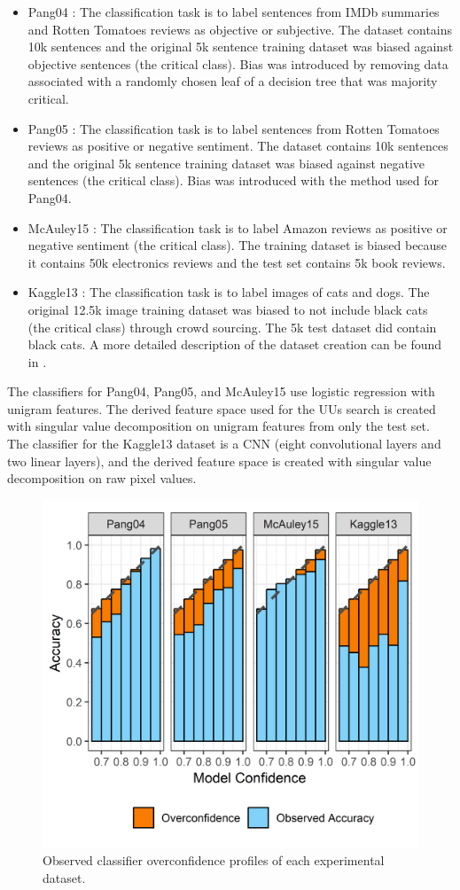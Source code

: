 \documentclass[conference]{IEEEtran}
\begin{document}
\begin{itemize}
\item Pang04 \citep{pang2004}: The classification task is to label sentences from IMDb summaries and Rotten Tomatoes reviews as objective or subjective.  The dataset contains 10k sentences and the original 5k sentence training dataset was biased against objective sentences (the critical class). Bias was introduced by removing data associated with a randomly chosen leaf of a decision tree that was majority critical.  
\item Pang05 \citep{pang2005}: The classification task is to label sentences from Rotten Tomatoes reviews as positive or negative sentiment.  The dataset contains 10k sentences and the original 5k sentence training dataset was biased against negative sentences (the critical class). Bias was introduced with the method used for Pang04.  
\item McAuley15 \citep{mcauley2015}: The classification task is to label Amazon reviews as positive or negative sentiment (the critical class). The training dataset is biased because it contains 50k electronics reviews and the test set contains 5k book reviews.
\item Kaggle13 \citep{kaggle2013}: The classification task is to label images of cats and dogs.  The original 12.5k image training dataset was biased to not include black cats (the critical class) through crowd sourcing. The 5k test dataset did contain black cats. A more detailed description of the dataset creation can be found in \cite{Bansal2018}.
\end{itemize}

The classifiers for Pang04, Pang05, and McAuley15 use logistic regression with unigram features. The derived feature space used for the UUs search is created with singular value decomposition on unigram features from only the test set. The classifier for the Kaggle13 dataset is a CNN (eight convolutional layers and two linear layers), and the derived feature space is created with singular value decomposition on raw pixel values.

\begin{figure}[hbtp]
  \includegraphics[width=.49\textwidth]{overconfidence_2.png}
  \caption{Observed classifier overconfidence profiles of each experimental dataset.}
  \label{fig:overconf}
\end{figure}
\end{document}
